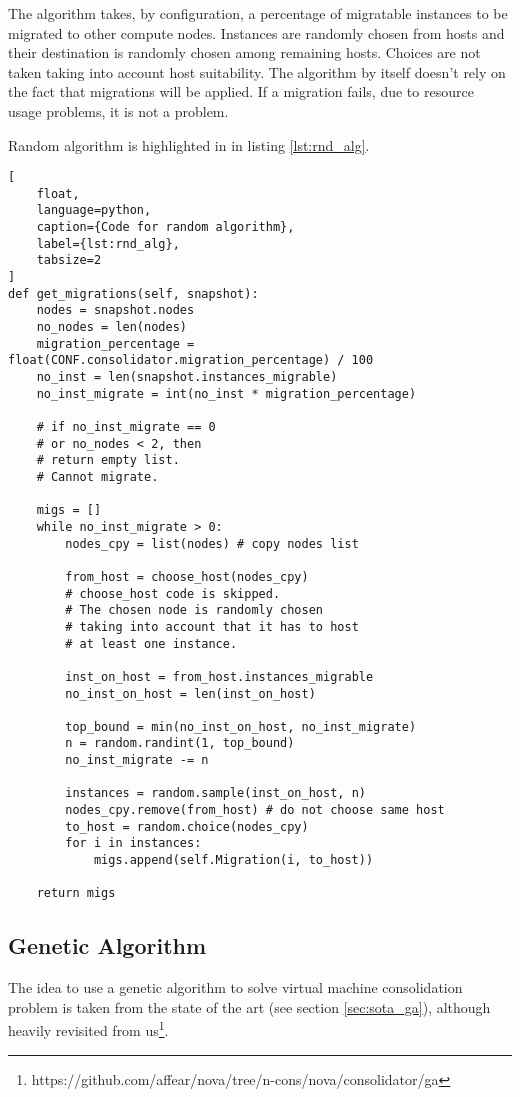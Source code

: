 The algorithm takes, by configuration, a percentage of migratable instances to be migrated to other compute nodes. Instances are randomly chosen from hosts and their destination is randomly chosen among remaining hosts. Choices are not taken taking into account host suitability. The algorithm by itself doesn't rely on the fact that migrations will be applied. If a migration fails, due to resource usage problems, it is not a problem.

Random algorithm is highlighted in in listing \ref{lst:rnd_alg}.

\begin{lstlisting}[
	float,
	language=python,
	caption={Code for random algorithm},
	label={lst:rnd_alg},
	tabsize=2
]
def get_migrations(self, snapshot):
	nodes = snapshot.nodes
	no_nodes = len(nodes)
	migration_percentage = float(CONF.consolidator.migration_percentage) / 100
	no_inst = len(snapshot.instances_migrable)
	no_inst_migrate = int(no_inst * migration_percentage)

	# if no_inst_migrate == 0
	# or no_nodes < 2, then
	# return empty list.
	# Cannot migrate.

	migs = []
	while no_inst_migrate > 0:
		nodes_cpy = list(nodes) # copy nodes list

		from_host = choose_host(nodes_cpy)
		# choose_host code is skipped.
		# The chosen node is randomly chosen
		# taking into account that it has to host
		# at least one instance.

		inst_on_host = from_host.instances_migrable
		no_inst_on_host = len(inst_on_host)

		top_bound = min(no_inst_on_host, no_inst_migrate)
		n = random.randint(1, top_bound)
		no_inst_migrate -= n

		instances = random.sample(inst_on_host, n)
		nodes_cpy.remove(from_host) # do not choose same host
		to_host = random.choice(nodes_cpy)
		for i in instances:
			migs.append(self.Migration(i, to_host))

	return migs
\end{lstlisting}

\subsection{Genetic Algorithm}
\label{sub:algs_ga}
The idea to use a genetic algorithm to solve virtual machine consolidation problem is taken from the state of the art (see section \ref{sec:sota_ga}), although heavily revisited from us\footnote{https://github.com/affear/nova/tree/n-cons/nova/consolidator/ga}.

